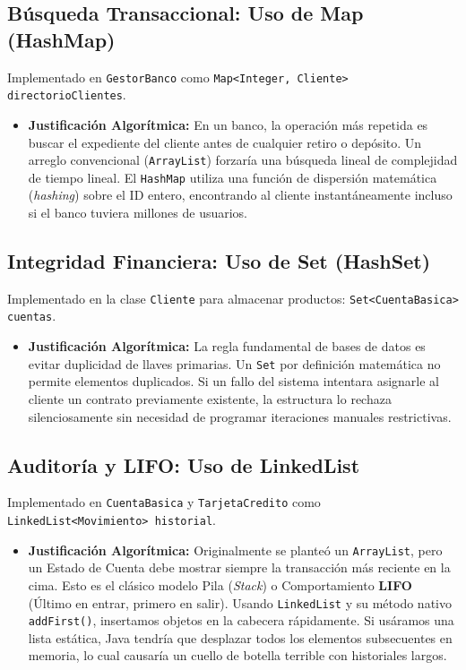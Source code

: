 \documentclass[12pt, letterpaper]{article}
\begin{document}
	\subsection{Búsqueda Transaccional: Uso de Map (HashMap)}
	Implementado en \texttt{GestorBanco} como \texttt{Map<Integer, Cliente> directorioClientes}. 
	\begin{itemize}
		\item \textbf{Justificación Algorítmica:} En un banco, la operación más repetida es buscar el expediente del cliente antes de cualquier retiro o depósito. Un arreglo convencional (\texttt{ArrayList}) forzaría una búsqueda lineal de complejidad de tiempo lineal. El \texttt{HashMap} \cite{oracle_hashmap} utiliza una función de dispersión matemática (\textit{hashing}) sobre el ID entero, encontrando al cliente instantáneamente incluso si el banco tuviera millones de usuarios.
	\end{itemize}
	
	\subsection{Integridad Financiera: Uso de Set (HashSet)}
	Implementado en la clase \texttt{Cliente} para almacenar productos: \texttt{Set<CuentaBasica> cuentas}.
	\begin{itemize}
		\item \textbf{Justificación Algorítmica:} La regla fundamental de bases de datos es evitar duplicidad de llaves primarias. Un \texttt{Set} por definición matemática no permite elementos duplicados. Si un fallo del sistema intentara asignarle al cliente un contrato previamente existente, la estructura lo rechaza silenciosamente sin necesidad de programar iteraciones manuales restrictivas.
	\end{itemize}
	
	\subsection{Auditoría y LIFO: Uso de LinkedList}
	Implementado en \texttt{CuentaBasica} y \texttt{TarjetaCredito} como \texttt{LinkedList<Movimiento> historial}.
	\begin{itemize}
		\item \textbf{Justificación Algorítmica:} Originalmente se planteó un \texttt{ArrayList}, pero un Estado de Cuenta debe mostrar siempre la transacción más reciente en la cima. Esto es el clásico modelo Pila (\textit{Stack}) o Comportamiento \textbf{LIFO} (Último en entrar, primero en salir). Usando \texttt{LinkedList} y su método nativo \texttt{addFirst()}, insertamos objetos en la cabecera rápidamente. Si usáramos una lista estática, Java tendría que desplazar todos los elementos subsecuentes en memoria, lo cual causaría un cuello de botella terrible con historiales largos.
	\end{itemize}
	
\end{document}
